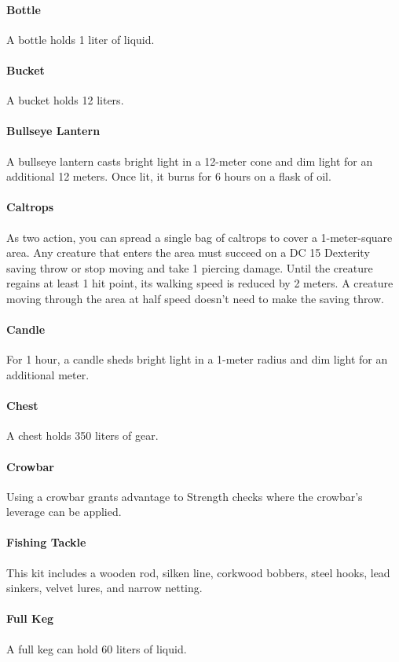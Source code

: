     \paragraph{Bottle}
        A bottle holds 1 liter of liquid.
    \paragraph{Bucket}
        A bucket holds 12 liters.
    \paragraph{Bullseye Lantern}
        A bullseye lantern casts bright light in a 12-meter cone and dim light for an additional 12 meters.
        Once lit, it burns for 6 hours on a flask of oil.
    \paragraph{Caltrops}
        As two action, you can spread a single bag of caltrops to cover a 1-meter-square area.
        Any creature that enters the area must succeed on a DC 15 Dexterity saving throw or stop moving and take 1 piercing damage.
        Until the creature regains at least 1 hit point, its walking speed is reduced by 2 meters.
        A creature moving through the area at half speed doesn't need to make the saving throw.
    \paragraph{Candle}
        For 1 hour, a candle sheds bright light in a 1-meter radius and dim light for an additional meter.
    \paragraph{Chest}
        A chest holds 350 liters of gear.
    \paragraph{Crowbar}
        Using a crowbar grants advantage to Strength checks where the crowbar's leverage can be applied.
    \paragraph{Fishing Tackle}
        This kit includes a wooden rod, silken line, corkwood bobbers, steel hooks, lead sinkers, velvet lures, and narrow netting.
    \paragraph{Full Keg}
        A full keg can hold 60 liters of liquid.
